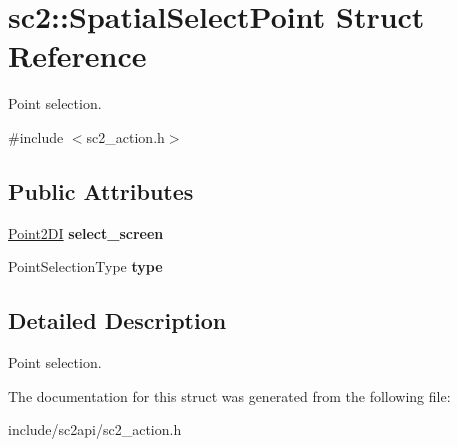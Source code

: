\hypertarget{structsc2_1_1_spatial_select_point}{}\section{sc2\+:\+:Spatial\+Select\+Point Struct Reference}
\label{structsc2_1_1_spatial_select_point}


Point selection.  




{\ttfamily \#include $<$sc2\+\_\+action.\+h$>$}

\subsection*{Public Attributes}
\begin{DoxyCompactItemize}
\item 
\mbox{\label{structsc2_1_1_spatial_select_point_abbb6db879e35b38997c472619e7dc474}} 
\hyperlink{structsc2_1_1_point2_d_i}{Point2\+DI} {\bfseries select\+\_\+screen}
\item 
\mbox{\label{structsc2_1_1_spatial_select_point_a393906b823f5fc96e72c8daebdc0e969}} 
Point\+Selection\+Type {\bfseries type}
\end{DoxyCompactItemize}


\subsection{Detailed Description}
Point selection. 

The documentation for this struct was generated from the following file\+:\begin{DoxyCompactItemize}
\item 
include/sc2api/sc2\+\_\+action.\+h\end{DoxyCompactItemize}
